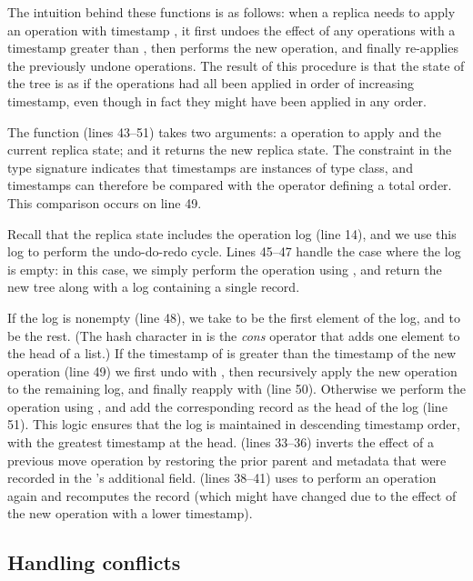 \documentclass[sigconf]{acmart}
\begin{document}
The intuition behind these functions is as follows: when a replica needs to apply an operation with timestamp , it first undoes the effect of any operations with a timestamp greater than , then performs the new operation, and finally re-applies the previously undone operations.
The result of this procedure is that the state of the tree is as if the operations had all been applied in order of increasing timestamp, even though in fact they might have been applied in any order.

The  function (lines 43--51) takes two arguments: a  operation to apply and the current replica state; and it returns the new replica state.
The constraint  in the type signature indicates that timestamps  are instances of  type class, and timestamps can therefore be compared with the \isa{<} operator defining a total order.
This comparison occurs on line 49.

Recall that the replica state includes the operation log (line 14), and we use this log to perform the undo-do-redo cycle.
Lines 45--47 handle the case where the log is empty: in this case, we simply perform the operation using , and return the new tree along with a log containing a single  record.

If the log is nonempty (line 48), we take  to be the first element of the log, and  to be the rest.
(The hash character in  is the \emph{cons} operator that adds one element to the head of a list.)
If the timestamp of  is greater than the timestamp of the new operation (line 49) we first undo  with , then recursively apply the new operation to the remaining log, and finally reapply  with  (line 50).
Otherwise we perform the operation using , and add the corresponding  record as the head of the log (line 51).
This logic ensures that the log is maintained in descending timestamp order, with the greatest timestamp at the head.
 (lines 33--36) inverts the effect of a previous move operation by restoring the prior parent and metadata that were recorded in the 's additional field.
 (lines 38--41) uses  to perform an operation again and recomputes the  record (which might have changed due to the effect of the new operation with a lower timestamp).

\subsection{Handling conflicts}\label{sec:conflicts}
\end{document}
